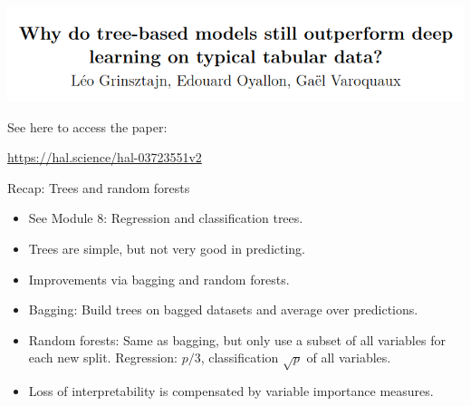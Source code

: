 \documentclass[
  10pt,
  ignorenonframetext,
]{beamer}
\providecommand{\tightlist}{%
  \setlength{\itemsep}{0pt}\setlength{\parskip}{0pt}}
\begin{document}
\begin{frame}
\includegraphics{graphics/why_outperform.png}

See here to access the paper:

\url{https://hal.science/hal-03723551v2}
\end{frame}

\begin{frame}
\begin{block}{Recap: Trees and random forests}
\protect\hypertarget{recap-trees-and-random-forests}{}
\(~\)

\begin{itemize}
\tightlist
\item
  See Module 8: Regression and classification trees.
\end{itemize}

\vspace{2mm}

\begin{itemize}
\tightlist
\item
  Trees are simple, but not very good in predicting.
\end{itemize}

\vspace{2mm}

\begin{itemize}
\tightlist
\item
  Improvements via bagging and random forests.
\end{itemize}

\vspace{2mm}

\begin{itemize}
\tightlist
\item
  Bagging: Build trees on bagged datasets and average over predictions.
\end{itemize}

\vspace{2mm}

\begin{itemize}
\tightlist
\item
  Random forests: Same as bagging, but only use a subset of all
  variables for each new split. Regression: \(p/3\), classification
  \(\sqrt{p}\) of all variables.
\end{itemize}

\vspace{2mm}

\begin{itemize}
\tightlist
\item
  Loss of interpretability is compensated by variable importance
  measures.
\end{itemize}
\end{block}
\end{frame}
\end{document}
